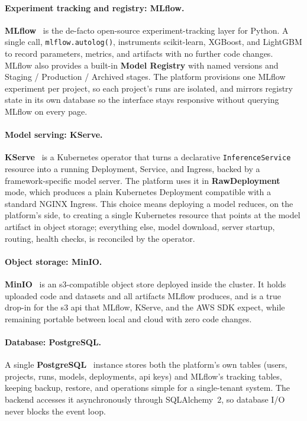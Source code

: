
\paragraph{Experiment tracking and registry: MLflow.}
\textbf{MLflow}~\cite{mlflow_docs} is the de-facto open-source
experiment-tracking layer for Python. A single call, \texttt{mlflow.autolog()},
instruments scikit-learn, XGBoost, and LightGBM to record parameters, metrics, and
artifacts with no further code changes. MLflow also provides a built-in
\textbf{Model Registry} with named versions and Staging / Production / Archived
stages. The platform provisions one MLflow experiment per project, so each
project's runs are isolated, and mirrors registry state in its own database so the
interface stays responsive without querying MLflow on every page.


\paragraph{Model serving: KServe.}
\textbf{KServe}~\cite{kserve_docs} is a Kubernetes operator that turns a
declarative \texttt{InferenceService} resource into a running Deployment, Service,
and Ingress, backed by a framework-specific model server. The platform uses it in
\textbf{RawDeployment} mode, which produces a plain Kubernetes Deployment
compatible with a standard NGINX Ingress. This choice means deploying a model
reduces, on the platform's side, to creating a single Kubernetes resource that
points at the model artifact in object storage; everything else, model download,
server startup, routing, health checks, is reconciled by the operator.


\paragraph{Object storage: MinIO.}
\textbf{MinIO}~\cite{minio_docs} is an \gls{s3}-compatible object store deployed
inside the cluster. It holds uploaded code and datasets and all artifacts MLflow
produces, and is a true drop-in for the \gls{s3} \gls{api} that MLflow, KServe,
and the AWS SDK expect, while remaining portable between local and cloud with zero
code changes.


\paragraph{Database: PostgreSQL.}
A single \textbf{PostgreSQL}~\cite{postgresql_docs} instance stores both the
platform's own tables (users, projects, runs, models, deployments, \gls{api} keys)
and MLflow's tracking tables, keeping backup, restore, and operations simple for a
single-tenant system. The backend accesses it asynchronously through
SQLAlchemy~2, so database I/O never blocks the event loop.

